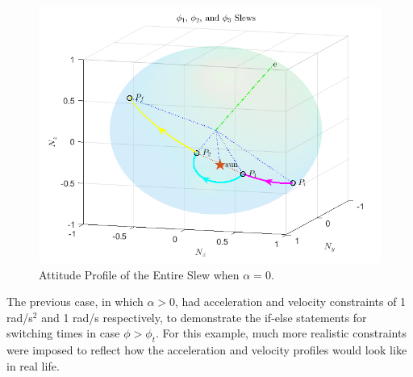 \documentclass[letterpaper, preprint, paper,11pt]{AAS}	%
\begin{document}
\begin{figure}[H]
	\begin{center}
		\includegraphics[width=4.75in]{figures/alpha0/phi1_phi2_phi3.png}
		\caption{Attitude Profile of the Entire Slew when $\alpha=0$.}
	\end{center}
	\label{fig:phi1_phi2_phi3_alpha0}
\end{figure}	

The previous case, in which $\alpha > 0 $, had acceleration and velocity constraints of 1 rad/s$^2$ and 1 rad/s respectively, to demonstrate the if-else statements for switching times in case $\phi > \phi_t$. For this example, much more realistic constraints were imposed to reflect how the acceleration and velocity profiles would look like in real life. 
\end{document}
